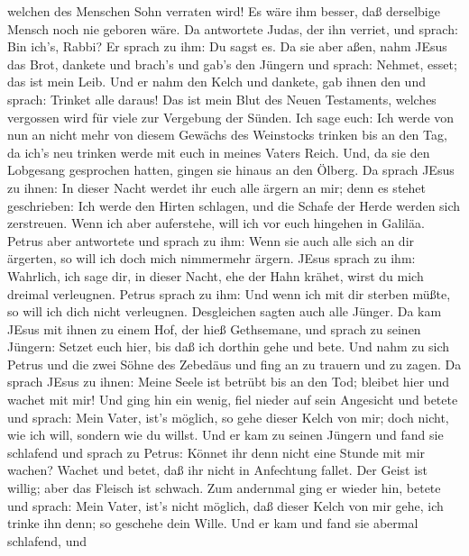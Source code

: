 welchen des Menschen Sohn verraten wird! Es wäre ihm besser, daß
derselbige Mensch noch nie geboren wäre.  Da antwortete
Judas, der ihn verriet, und sprach: Bin ich's, Rabbi? Er sprach zu ihm:
Du sagst es.  Da sie aber aßen, nahm JEsus das Brot,
dankete und brach's und gab's den Jüngern und sprach: Nehmet, esset; das
ist mein Leib.  Und er nahm den Kelch und dankete, gab
ihnen den und sprach: Trinket alle daraus!  Das ist mein
Blut des Neuen Testaments, welches vergossen wird für viele zur
Vergebung der Sünden.  Ich sage euch: Ich werde von nun an
nicht mehr von diesem Gewächs des Weinstocks trinken bis an den Tag, da
ich's neu trinken werde mit euch in meines Vaters Reich. 
Und, da sie den Lobgesang gesprochen hatten, gingen sie hinaus an den
Ölberg.  Da sprach JEsus zu ihnen: In dieser Nacht werdet
ihr euch alle ärgern an mir; denn es stehet geschrieben: Ich werde den
Hirten schlagen, und die Schafe der Herde werden sich zerstreuen.
 Wenn ich aber auferstehe, will ich vor euch hingehen in
Galiläa.  Petrus aber antwortete und sprach zu ihm: Wenn
sie auch alle sich an dir ärgerten, so will ich doch mich nimmermehr
ärgern.  JEsus sprach zu ihm: Wahrlich, ich sage dir, in
dieser Nacht, ehe der Hahn krähet, wirst du mich dreimal verleugnen.
 Petrus sprach zu ihm: Und wenn ich mit dir sterben müßte,
so will ich dich nicht verleugnen. Desgleichen sagten auch alle Jünger.
 Da kam JEsus mit ihnen zu einem Hof, der hieß Gethsemane,
und sprach zu seinen Jüngern: Setzet euch hier, bis daß ich dorthin gehe
und bete.  Und nahm zu sich Petrus und die zwei Söhne des
Zebedäus und fing an zu trauern und zu zagen.  Da sprach
JEsus zu ihnen: Meine Seele ist betrübt bis an den Tod; bleibet hier und
wachet mit mir!  Und ging hin ein wenig, fiel nieder auf
sein Angesicht und betete und sprach: Mein Vater, ist's möglich, so gehe
dieser Kelch von mir; doch nicht, wie ich will, sondern wie du willst.
 Und er kam zu seinen Jüngern und fand sie schlafend und
sprach zu Petrus: Könnet ihr denn nicht eine Stunde mit mir wachen?
 Wachet und betet, daß ihr nicht in Anfechtung fallet. Der
Geist ist willig; aber das Fleisch ist schwach.  Zum
andernmal ging er wieder hin, betete und sprach: Mein Vater, ist's nicht
möglich, daß dieser Kelch von mir gehe, ich trinke ihn denn; so geschehe
dein Wille.  Und er kam und fand sie abermal schlafend, und
